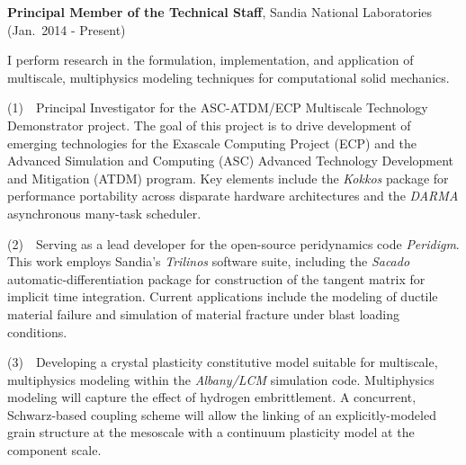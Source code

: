 \documentclass[11pt]{article}
\newlength{\minipagewidth} \setlength{\minipagewidth}{6.25in} %
\begin{document}
\begin{minipage}{\minipagewidth}
\textbf{Principal Member of the Technical Staff}, Sandia National Laboratories (Jan.~2014 - Present)
\vspace{0.06in}

I perform research in the formulation, implementation, and application of multiscale, multiphysics modeling techniques for computational solid mechanics.
\vspace{0.06in}

(1)~~Principal Investigator for the ASC-ATDM/ECP Multiscale Technology Demonstrator project.  The goal of this project is to drive development of emerging technologies for the Exascale Computing Project (ECP) and the Advanced Simulation and Computing (ASC) Advanced Technology Development and Mitigation (ATDM) program.  Key elements include the \emph{Kokkos} package for performance portability across disparate hardware architectures and the \emph{DARMA} asynchronous many-task scheduler.
\vspace{0.06in}


(2)~~Serving as a lead developer for the open-source peridynamics code \emph{Peridigm}.  This work employs Sandia's \emph{Trilinos} software suite, including the \emph{Sacado} automatic-differentiation package for construction of the tangent matrix for implicit time integration.  Current applications include the modeling of ductile material failure and simulation of material fracture under blast loading conditions.
\vspace{0.06in}

(3)~~Developing a crystal plasticity constitutive model suitable for multiscale, multiphysics modeling within the \emph{Albany/LCM} simulation code.  Multiphysics modeling will capture the effect of hydrogen embrittlement.  A concurrent, Schwarz-based coupling scheme will allow the linking of an explicitly-modeled grain structure at the mesoscale with a continuum plasticity model at the component scale.
\vspace{0.06in}

\end{minipage}\vspace{\parskip}
\end{document}
